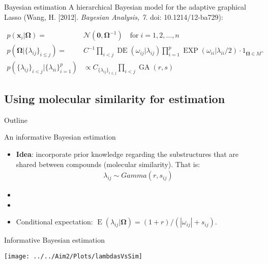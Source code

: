 \documentclass[xcolor=dvipsnames]{beamer}
\DeclareMathOperator{\EE}{E}
\DeclareMathOperator{\DE}{DE}
\DeclareMathOperator{\EXP}{EXP}
\DeclareMathOperator{\GA}{GA}
\begin{document}
\begin{frame}{Bayesian estimation}
	\vspace{-15.5pt}
	A hierarchical Bayesian model for the adaptive graphical Lasso (Wang, H. [2012]. \emph{Bayesian Analysis, 7}. doi: 10.1214/12-ba729):
	
	\begin{align*}
	p(\mathbf{x}_i|\boldsymbol{\Omega}) = & \mathcal{N}(\mathbf{0,\boldsymbol{\Omega}}^{-1}) \quad \text{for} \; i=1,2,\hdots,n\\
	p(\boldsymbol{\Omega}|\{\lambda_{ij}\}_{i\leq j}) = & C^{-1} \prod_{i<j} \DE(\omega_{ij}|\lambda_{ij}) \prod_{i=1}^{p} \EXP (\omega_{ii} | \lambda_{ii} / 2) \cdot 1_{\boldsymbol{\Omega}\in M^+}\\
	p(\{\lambda_{ij}\}_{i<j}|\{\lambda_{ii}\}_{i=1}^p) &\propto C_{\{\lambda_{ij}\}_{i\leq j}} \prod_{i<j} \GA(r,s)
	\end{align*}
\end{frame}

\subsection{Using molecular similarity for estimation}

\begin{frame}{Outline}
\vspace{-10.5pt}
\tableofcontents[currentsection,subsectionstyle=show/shaded/hide]
\addtocounter{framenumber}{-1}
\end{frame}

\begin{frame}{An informative Bayesian estimation}
	\vspace{-15.5pt}
	\begin{itemize}
		\item \textbf{Idea}:  incorporate prior knowledge regarding the substructures that are shared between compounds (molecular similarity). That is:
		\begin{align*}
			\lambda_{ij}\sim Gamma(r,s_{ij})
		\end{align*}\pause
		\item[]
		\item[]
		\item Conditional expectation: $\EE(\lambda_{ij}|\boldsymbol{\Omega})=(1+r)/(|\omega_{ij} |+s_{ij})$.
	\end{itemize}
\end{frame}

\begin{frame}{Informative Bayesian estimation}
	\begin{center}
			\texttt{[image: ../../Aim2/Plots/lambdasVsSim]}
	\end{center}
\end{frame}
\end{document}
